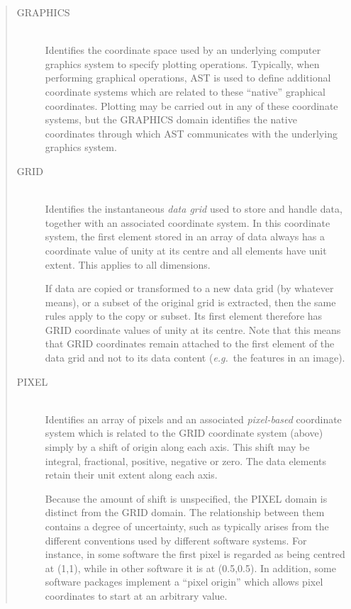 \documentclass[twoside,11pt]{starlink}
\begin{document}
\begin{quote}
\begin{description}
\item[GRAPHICS]\mbox{}\\
Identifies the coordinate space used by an underlying computer
graphics system to specify plotting operations. Typically, when
performing graphical operations, AST is used to define additional
coordinate systems which are related to these ``native'' graphical
coordinates.  Plotting may be carried out in any of these coordinate
systems, but the GRAPHICS domain identifies the native coordinates
through which AST communicates with the underlying graphics system.

\item[GRID]\mbox{}\\
Identifies the instantaneous \emph{data grid} used to store and handle
data, together with an associated coordinate system. In this
coordinate system, the first element stored in an array of data always
has a coordinate value of unity at its centre and all elements have
unit extent. This applies to all dimensions.

If data are copied or transformed to a new data grid (by whatever
means), or a subset of the original grid is extracted, then the same
rules apply to the copy or subset. Its first element therefore has
GRID coordinate values of unity at its centre. Note that this means
that GRID coordinates remain attached to the first element of the data
grid and not to its data content (\emph{e.g.}\ the features in an
image).

\item[PIXEL]\mbox{}\\
Identifies an array of pixels and an associated \emph{pixel-based}
coordinate system which is related to the GRID coordinate system
(above) simply by a shift of origin along each axis. This shift may be
integral, fractional, positive, negative or zero. The data elements
retain their unit extent along each axis.

Because the amount of shift is unspecified, the PIXEL domain is
distinct from the GRID domain. The relationship between them contains
a degree of uncertainty, such as typically arises from the different
conventions used by different software systems. For instance, in some
software the first pixel is regarded as being centred at (1,1), while
in other software it is at (0.5,0.5). In addition, some software
packages implement a ``pixel origin'' which allows pixel coordinates
to start at an arbitrary value.


\end{description}
\end{quote}
\end{document}
